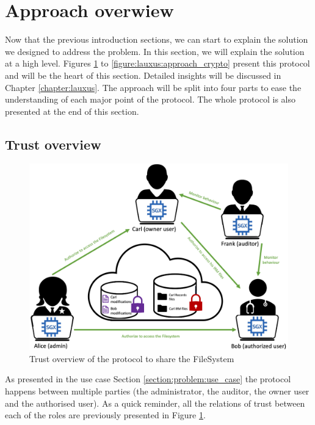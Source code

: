 \documentclass[../main.tex]{subfiles}
\begin{document}
\section{Approach overwiew}
\label{section:lauxus:approach}
\par Now that the previous introduction sections, we can start to explain the solution we designed to address the problem. In this section, we will explain the solution at a high level. Figures \ref{figure:lauxus:approach_trust} to \ref{figure:lauxus:approach_crypto} present this protocol and will be the heart of this section. Detailed insights will be discussed in Chapter \ref{chapter:lauxus}. The approach will be split into four parts to ease the understanding of each major point of the protocol. The whole protocol is also presented at the end of this section.


\subsection{Trust overview}
\label{section:lauxus:approach_trust}
\begin{figure}[h]
    \centering
    \includegraphics[width=\textwidth]{images/lauxus/approach_trust}
    
    \caption{Trust overview of the protocol to share the FileSystem}
    \label{figure:lauxus:approach_trust}
\end{figure}
\par As presented in the use case Section \ref{section:problem:use_case} the protocol happens between multiple parties (the administrator, the auditor, the owner user and the authorised user). As a quick reminder, all the relations of trust between each of the roles are previously presented in Figure \ref{figure:lauxus:approach_trust}.
\end{document}
